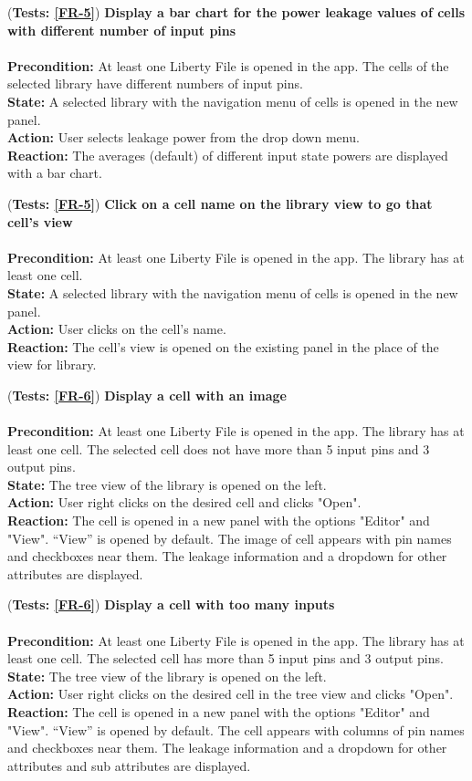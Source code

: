 \documentclass[10pt,a4paper]{report}
\newcommand{\precondition}[1]{
    \textbf{Precondition: } #1 \leavevmode \\
}
\newcommand{\action}[1]{
    \textbf{Action: } #1 \leavevmode \\
}
\newcommand{\state}[1]{
    \textbf{State: } #1 \leavevmode \\
}
\newcommand{\reaction}[1]{
    \textbf{Reaction: } #1 \leavevmode \\
}
\newcommand{\GTCDescription}[2]{
    (\textbf{Tests: #1}) \textbf{#2} \leavevmode \\
}
\begin{document}
\begin{GTC}
    \item \GTCDescription{\ref{FR-5}}
    {Display a bar chart for the power leakage values of cells with different number of input pins} \leavevmode \\ 
        \precondition{At least one Liberty File is opened in the app. The cells of the selected library have different numbers of input pins.}
        \state{A selected library with the navigation menu of cells is opened in the new panel.}
        \action{User selects leakage power from the drop down menu.}
        \reaction{The averages (default) of different input state powers are displayed with a bar chart.}\label{GTC-11}
    
    \item \GTCDescription{\ref{FR-5}}
    {Click on a cell name on the library view to go that cell's view} \leavevmode \\ 
        \precondition{At least one Liberty File is opened in the app. The library has at least one cell.}
        \state{A selected library with the navigation menu of cells is opened in the new panel.}
        \action{User clicks on the cell's name.}
        \reaction{The cell's view is opened on the existing panel in the place of the view for library.}\label{GTC-12}
    
    \item \GTCDescription{\ref{FR-6}}
    {Display a cell with an image} \leavevmode \\ 
        \precondition{At least one Liberty File is opened in the app. The library has at least one cell. The selected cell does not have more than 5 input pins and 3 output pins.}
        \state{The tree view of the library is opened on the left.}
        \action{User right clicks on the desired cell and clicks "Open".}
        \reaction{The cell is opened in a new panel with the options "Editor" and  "View". “View” is opened by default. The image of cell appears with pin names and checkboxes near them. The leakage information and a dropdown for other attributes are displayed.}\label{GTC-13}
    
    \item \GTCDescription{\ref{FR-6}}
    {Display a cell with too many inputs} \leavevmode \\ 
        \precondition{At least one Liberty File is opened in the app. The library has at least one cell. The selected cell has more than 5 input pins and 3 output pins.}
        \state{The tree view of the library is opened on the left.}
        \action{User right clicks on the desired cell in the tree view and clicks "Open".}
        \reaction{The cell is opened in a new panel with the options "Editor" and "View". “View” is opened by default. The cell appears with columns of pin names and checkboxes near them. The leakage information and a dropdown for other attributes and sub attributes are displayed.}\label{GTC-14}
    

\end{GTC}
\end{document}
